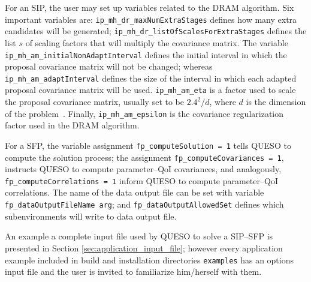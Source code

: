 For an SIP, the user may set up variables related to the DRAM algorithm. Six important variables are:  
\texttt{ip\_mh\_dr\_maxNumExtraStages} defines how many extra candidates will be generated; 
\texttt{ip\_mh\_dr\_listOfScalesForExtraStages} defines the list $s$ of scaling factors that will multiply the covariance matrix.
The variable \texttt{ip\_mh\_am\_initialNonAdaptInterval} defines the initial interval in which the proposal covariance matrix will not be changed;
whereas \texttt{ip\_mh\_am\_adaptInterval} defines the size of the interval in which each adapted proposal covariance matrix will be used. 
\texttt{ip\_mh\_am\_eta} is a factor used to scale the proposal covariance matrix, usually set to be $2.4^2/d$, where $d$ is the dimension of the problem~\cite{Laine08,HaLaMiSa06}. 
Finally, \texttt{ip\_mh\_am\_epsilon} is the covariance regularization factor used in the DRAM algorithm. %

For a SFP, the variable assignment \verb+fp_computeSolution = 1+ tells QUESO to compute the solution process; the assignment \verb+fp_computeCovariances = 1+,  instructs QUESO to compute parameter--QoI covariances, and analogously, \verb+fp_computeCorrelations = 1+ inform QUESO to compute  parameter--QoI correlations. The name of the data output file can be set with variable \verb+fp_dataOutputFileName arg+;  and \verb+fp_dataOutputAllowedSet+ defines which subenvironments will write to data output file.

An example a complete input file used by QUESO to solve a SIP--SFP is presented in Section \ref{sec:application_input_file}; however every application example included in \Queso{} build and installation directories \verb+examples+ has an options input file and the user is invited to familiarize him/herself with them.
% 
% 
% 
% 
% 
% 
